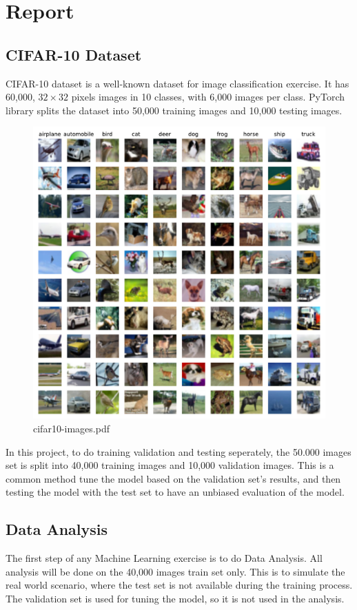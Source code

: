\documentclass{report}
\begin{document}
\chapter*{Report}

\section{CIFAR-10 Dataset}
CIFAR-10 dataset is a well-known dataset for image classification exercise. It has 60,000, $32\times32$ pixels images 
in 10 classes, with 6,000 images per class. PyTorch library splits the dataset into 50,000 training images and 
10,000 testing images. 

\begin{figure}[ht]
    \center
    \includegraphics[scale=0.7]{../output/cifar10-images.pdf}
    \caption{cifar10-images.pdf}
\end{figure}

In this project, to do training validation and testing seperately, the 50.000 images set is split into 40,000 
training images and 10,000 validation images. This is a common method tune the model based on the validation 
set's results, and then testing the model with the test set to have an unbiased evaluation of the model.

\section{Data Analysis}
The first step of any Machine Learning exercise is to do Data Analysis. All analysis will be done on the 40,000 
images train set only. This is to simulate the real world scenario, where the test set is not available during the 
training process. The validation set is used for tuning the model, so it is not used in the analysis.
\end{document}

